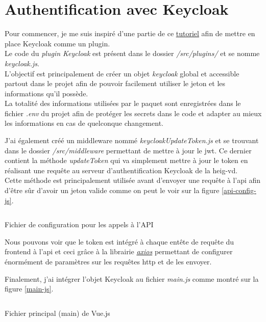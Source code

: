 \documentclass[
    iai, %
    il, %
]{heig-tb}
\begin{document}
\section{Authentification avec Keycloak}
Pour commencer, je me suis inspiré d'une partie de ce \href{https://davidtruxall.com/secure-a-vue-js-app-with-keycloak/}{tutoriel} afin de mettre en place Keycloak comme un plugin. \\
Le code du \emph{plugin Keycloak} est présent dans le dossier \emph{/src/plugins/} et se nomme \emph{keycloak.js}. \\
L'objectif est principalement de créer un objet \emph{keycloak} global et accessible partout dans le projet afin de pouvoir facilement utiliser le jeton et les informations qu'il possède. \\
La totalité des informations utilisées par le paquet sont enregistrées dans le fichier \emph{.env} du projet afin de protéger les secrets dans le code et adapter au mieux les informations en cas de quelconque changement.

J'ai également créé un middleware nommé \emph{keycloakUpdateToken.js} et se trouvant dans le dossier \emph{/src/middleware} permettant de mettre à jour le \Gls{jwt}. Ce dernier contient la méthode \emph{updateToken} qui va simplement mettre à jour le token en réalisant une requête au serveur d'authentification Keycloak de la \Gls{heig-vd}. \\
Cette méthode est principalement utilisée avant d'envoyer une requête à l'\Gls{api} afin d'être sûr d'avoir un jeton valide comme on peut le voir sur la figure \ref{api-config-js}. \\

\begin{listing}[H]
    \inputminted{js}{assets/code/apiConfig.js}
    \caption{Fichier de configuration pour les appels à l'API \label{api-config-js}}
\end{listing}

Nous pouvons voir que le token est intégré à chaque entête de requête du \Gls{frontend} à l'\Gls{api} et ceci grâce à la librairie \href{https://axios-http.com/fr/docs/intro}{\emph{axios}} permettant de configurer énormément de paramètres sur les requêtes \Gls{http} et de les envoyer.

Finalement, j'ai intégrer l'objet Keycloak au fichier \emph{main.js} comme montré sur la figure \ref{main-js}.

\begin{listing}[H]
    \inputminted{js}{assets/code/main.js}
    \caption{Fichier principal (main) de Vue.js \label{main-js}}
\end{listing}
\end{document}
